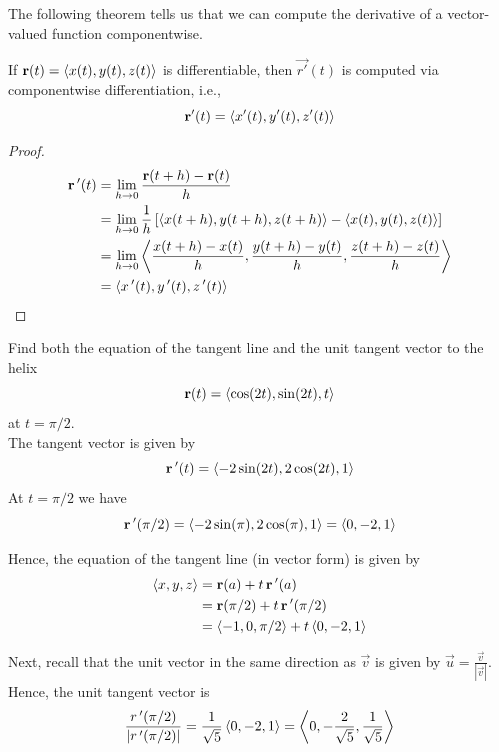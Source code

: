 \documentclass[handout]{ximera}
\begin{document}
The following theorem tells us that we can compute the derivative of a vector-valued function componentwise.

\begin{theorem}
If $\mathbf{r}(t) = \left\langle x(t), y(t), z(t)\right\rangle$ is differentiable, then $\vec{r'}(t)$ is computed via componentwise differentiation, i.e.,
\[
\mathbf{r'}(t) = \left\langle x'(t), y'(t), z'(t)\right\rangle
\] 
\end{theorem}

\begin{proof}

\begin{align*}
\mathbf{r\,'}(t) &= \lim_{h \to 0} \dfrac{\mathbf{r}(t+h)-\mathbf{r}(t)}{h}\\
&= \lim_{h \to 0}\dfrac{1}{h}\left[\left\langle x(t+h), y(t+h), z(t+h)\right\rangle - \left\langle x(t), y(t), z(t) \right\rangle \right]\\
  &=\lim_{h \to 0} \left\langle \dfrac{x(t+h)-x(t)}{h},  \dfrac{y(t+h)-y(t)}{h},\dfrac{z(t+h)-z(t)}{h}\right\rangle\\
  &= \left\langle x\,'(t), y\,'(t), z\,'(t)\right\rangle
\end{align*}

\end{proof}




\begin{example}[Example 3] 
Find both the equation of the tangent line and the unit tangent vector to the helix
\[
\mathbf r(t) = \left\langle \cos(2t), \sin(2t), t\right\rangle
\]
at $t = \pi/2$.\\
The tangent vector is given by
\[
\mathbf r\,'(t) = \left\langle -2\sin(2t), 2\cos(2t), 1\right\rangle
\]
At $t = \pi/2$ we have
\[
\mathbf r\,'(\pi/2) = \left\langle -2\sin(\pi), 2\cos(\pi), 1\right\rangle = \left\langle 0, -2, 1\right\rangle
\]

Hence, the equation of the tangent line (in vector form) is given by
\begin{align*}
\left\langle x, y, z\right\rangle &= \mathbf r(a) + t\,\mathbf r\,'(a)\\
&= \mathbf r(\pi/2) + t\,\mathbf r\,'(\pi/2)\\
  &= \left\langle -1, 0, \pi/2\right\rangle  +t\left\langle 0, -2, 1\right\rangle
\end{align*}

Next, recall that the unit vector in the same direction as $\vec{v}$ is given by $\vec{u} = \frac{\vec{v}}{|\vec{v}|}$.
Hence, the unit tangent vector is
\[
\frac{r\,'(\pi/2)}{|r\,'(\pi/2)|} = \frac{1}{\sqrt 5}\left\langle 0, -2, 1\right\rangle = \left\langle 0, -\frac{2}{\sqrt 5}, \frac{1}{\sqrt 5}\right\rangle
\]

\end{example}
\end{document}
